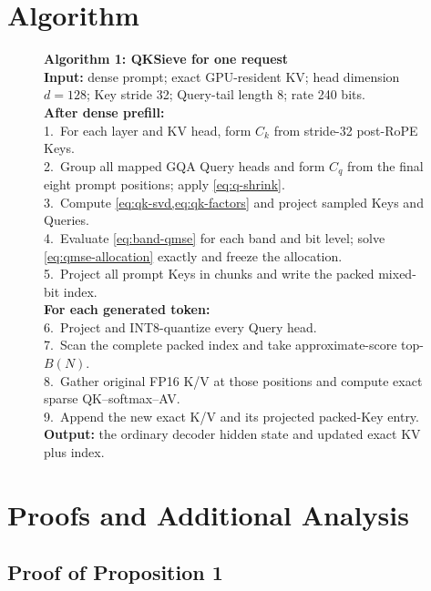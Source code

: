 \section{Algorithm}
\label{app:algorithm}

\begin{figure}[h]
\small
\begin{minipage}{0.96\linewidth}
\textbf{Algorithm 1: QKSieve for one request}\\[2pt]
\textbf{Input:} dense prompt; exact GPU-resident KV; head dimension
$d=128$; Key stride 32; Query-tail length 8; rate 240 bits.\\
\textbf{After dense prefill:}\\
1.\ For each layer and KV head, form $C_k$ from stride-32 post-RoPE Keys.\\
2.\ Group all mapped GQA Query heads and form $C_q$ from the final eight
prompt positions; apply \cref{eq:q-shrink}.\\
3.\ Compute \cref{eq:qk-svd,eq:qk-factors} and project sampled Keys and
Queries.\\
4.\ Evaluate \cref{eq:band-qmse} for each band and bit level; solve
\cref{eq:qmse-allocation} exactly and freeze the allocation.\\
5.\ Project all prompt Keys in chunks and write the packed mixed-bit index.\\
\textbf{For each generated token:}\\
6.\ Project and INT8-quantize every Query head.\\
7.\ Scan the complete packed index and take approximate-score top-$B(N)$.\\
8.\ Gather original FP16 K/V at those positions and compute exact sparse
QK--softmax--AV.\\
9.\ Append the new exact K/V and its projected packed-Key entry.\\
\textbf{Output:} the ordinary decoder hidden state and updated exact KV plus
index.
\end{minipage}
\end{figure}



\section{Proofs and Additional Analysis}
\label{app:proofs}

\subsection{Proof of Proposition 1}

